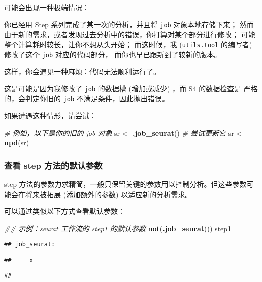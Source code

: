 \documentclass[
]{article}
\newenvironment{Shaded}{\begin{snugshade}}{\end{snugshade}}
\newcommand{\CommentTok}[1]{\textcolor[rgb]{0.56,0.35,0.01}{\textit{#1}}}
\newcommand{\KeywordTok}[1]{\textcolor[rgb]{0.13,0.29,0.53}{\textbf{#1}}}
\newcommand{\NormalTok}[1]{#1}
\newcommand{\StringTok}[1]{\textcolor[rgb]{0.31,0.60,0.02}{#1}}
\begin{document}
可能会出现一种极端情况：

你已经用 Step 系列完成了某一次的分析，并且将 \texttt{job} 对象本地存储下来；
然而由于新的需求，或者发现过去分析中的错误，你打算对某个部分进行修改；
可能整个计算耗时较长，让你不想从头开始；
而这时候，我 (\texttt{utils.tool} 的编写者) 修改了这个 \texttt{job} 对应的代码部分，
而你也早已跟新到了较新的版本。

这样，你会遇见一种麻烦：代码无法顺利运行了。

这是可能是因为我修改了 \texttt{job} 的数据槽 (增加或减少) ，而 S4 的数据检查是
严格的，会判定你旧的 \texttt{job} 不满足条件，因此抛出错误。

如果遭遇这种情形，请尝试：

\begin{Shaded}
\begin{Highlighting}[]
\CommentTok{\# 例如，以下是你的旧的 \textasciigrave{}job\textasciigrave{} 对象}
\NormalTok{sr \textless{}{-}}\StringTok{ }\KeywordTok{.job\_seurat}\NormalTok{()}
\CommentTok{\# 尝试更新它}
\NormalTok{sr \textless{}{-}}\StringTok{ }\KeywordTok{upd}\NormalTok{(sr)}
\end{Highlighting}
\end{Shaded}

\hypertarget{params}{%
\subsubsection{查看 step 方法的默认参数}\label{params}}

step 方法的参数力求精简，一般只保留关键的参数用以控制分析。但这些参数可能会在将来被拓展 (添加额外的参数) 以适应新的分析需求。

可以通过类似以下方式查看默认参数：

\begin{Shaded}
\begin{Highlighting}[]
\CommentTok{\#\# 示例：seurat 工作流的 step1 的默认参数}
\KeywordTok{not}\NormalTok{(}\KeywordTok{.job\_seurat}\NormalTok{())}
\NormalTok{step1}
\end{Highlighting}
\end{Shaded}

\begin{verbatim}
## job_seurat:
\end{verbatim}

\begin{verbatim}
##     x
\end{verbatim}

\begin{verbatim}
## 
\end{verbatim}
\end{document}
